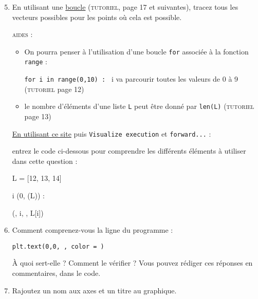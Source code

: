 \documentclass[11pt]{article}
\begin{document}
 \begin{enumerate}
 
 \setcounter{enumi}{4}
 \item En utilisant une \underline{boucle} (\textsc{tutoriel}, page 17 et suivantes), tracez tous les vecteurs possibles pour les points où cela est possible.
 
 
 \smallskip
 
 \begin{multicols}{2}
 
 \textsc{aides : }
 \begin{itemize}
 \item On pourra penser à l'utilisation d'une boucle \texttt{for} associée à la fonction \texttt{range} : 
 
 \texttt{for i in range(0,10) : } i va parcourir toutes les valeurs de 0 à 9 (\textsc{tutoriel} page 12)
  \item le nombre d'éléments d'une liste \texttt{L} peut être donné par \texttt{len(L)} (\textsc{tutoriel} page 13)
 \end{itemize}

 
 \href{http://www.pythontutor.com/visualize.html\#mode=display}{En utilisant ce site} puis \texttt{Visualize execution} et \texttt{forward...} : 
 
 entrez le code ci-dessous pour comprendre les différents éléments à utiliser dans cette question : 
 
 
 
 \begin{python}{0.45}
  L = [12, 13, 14]
  
  \for i \dans \range(0, \len(L)) : 
  
  \tabis \print(, i, , L[i])
 \end{python}

 
 
 \end{multicols}
 
 
 
 
 
 
 \item Comment comprenez-vous la ligne du programme : 
 
 \texttt{plt.text(0,0, , color = )}
 
 
 À quoi sert-elle ? Comment le vérifier ? Vous pouvez rédiger ces réponses en commentaires, dans le code.
 
 
 
 \item Rajoutez un nom aux axes et un titre au graphique.

 
 \end{enumerate}
\end{document}
